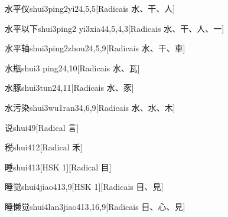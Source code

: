 \begin{entry}{水平仪}{shui3ping2yi2}{4,5,5}[Radicais ⽔、⼲、⼈]
\end{entry}

\begin{entry}{水平以下}{shui3ping2 yi3xia4}{4,5,4,3}[Radicais ⽔、⼲、⼈、⼀]
\end{entry}

\begin{entry}{水平轴}{shui3ping2zhou2}{4,5,9}[Radicais ⽔、⼲、⾞]
\end{entry}

\begin{entry}{水瓶}{shui3 ping2}{4,10}[Radicais ⽔、⽡]
\end{entry}

\begin{entry}{水豚}{shui3tun2}{4,11}[Radicais ⽔、⾗]
\end{entry}

\begin{entry}{水污染}{shui3wu1ran3}{4,6,9}[Radicais ⽔、⽔、⽊]
\end{entry}

\begin{entry}{说}{shui4}{9}[Radical ⾔]
\end{entry}

\begin{entry}{税}{shui4}{12}[Radical ⽲]
\end{entry}

\begin{entry}{睡}{shui4}{13}[HSK 1][Radical ⽬]
\end{entry}

\begin{entry}{睡觉}{shui4jiao4}{13,9}[HSK 1][Radicais ⽬、⾒]
\end{entry}

\begin{entry}{睡懒觉}{shui4lan3jiao4}{13,16,9}[Radicais ⽬、⼼、⾒]
\end{entry}

